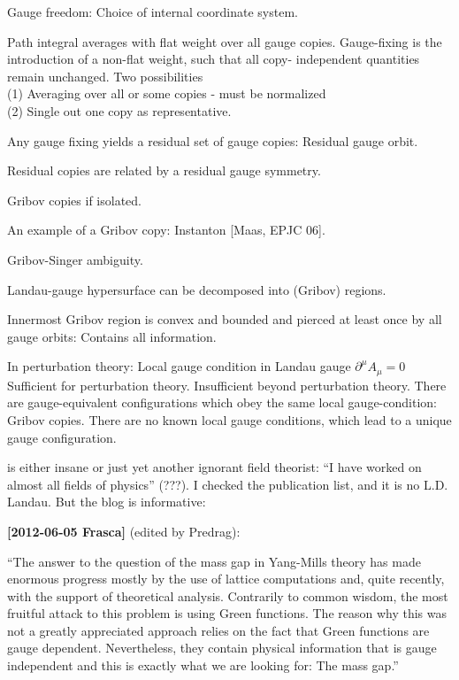 \begin{description}
Gauge freedom: Choice of
internal coordinate system.

Path integral averages with flat weight over all gauge copies.
Gauge-fixing is the introduction of a non-flat weight, such that all
copy- independent quantities remain unchanged.
Two possibilities
\\
(1)
Averaging over all or some
copies - must be normalized
\\
(2)
Single out one copy as representative.

Any gauge fixing yields a residual set of gauge copies: Residual gauge
orbit.

Residual copies are related by a residual gauge symmetry.

Gribov copies if isolated.

An example of a Gribov copy: Instanton
[Maas, EPJC 06].

Gribov-Singer ambiguity.

Landau-gauge hypersurface can be decomposed into (Gribov) regions.

Innermost Gribov region is convex and bounded and pierced at least once
by all gauge orbits: Contains all information.

In perturbation theory: Local gauge condition in Landau gauge
$\partial^\mu A_\mu=0$
Sufficient for perturbation theory. Insufficient beyond perturbation theory.
There are gauge-equivalent configurations which obey the same
local gauge-condition: Gribov copies. There are no known local gauge conditions, which lead to a
unique gauge configuration.

\item[2012-06-14 Predrag]
 is either insane
or just yet another ignorant field theorist: ``I have worked on almost
all fields of physics'' (???). I checked the publication list, and it is
no  L.D. Landau. But the blog is informative:

{\bf [2012-06-05 Frasca]} (edited by Predrag):

``The answer to the question of the mass gap in Yang-Mills theory has
made enormous progress mostly by the use of lattice computations and,
quite recently, with the support of theoretical analysis. Contrarily to
common wisdom, the most fruitful attack to this problem is using Green
functions. The reason why this was not a greatly appreciated approach
relies on the fact that Green functions are gauge dependent.
Nevertheless, they contain physical information that is gauge independent
and this is exactly what we are looking for: The mass gap.''


\end{description}
